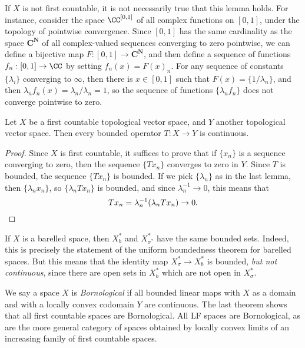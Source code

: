 \begin{example}
    If $X$ is not first countable, it is not necessarily true that this lemma holds. For instance, consider the space $\CC^{[0,1]}$ of all complex functions on $[0,1]$, under the topology of pointwise convergence. Since $[0,1]$ has the same cardinality as the space $\mathbf{C}^{\mathbf{N}}$ of all complex-valued sequences converging to zero pointwise, we can define a bijective map $F: [0,1] \to \mathbf{C}^{\mathbf{N}}$, and then define a sequence of functions $f_n: [0,1] \to \CC$ by setting $f_n(x) = F(x)_n$. For any sequence of constants $\{ \lambda_i \}$ converging to $\infty$, then there is $x \in [0,1]$ such that $F(x) = \{ 1/\lambda_n \}$, and then $\lambda_n f_n(x) = \lambda_n/\lambda_n = 1$, so the sequence of functions $\{ \lambda_n f_n \}$ does not converge pointwise to zero.
\end{example}

\begin{theorem}
    Let $X$ be a first countable topological vector space, and $Y$ another topological vector space. Then every bounded operator $T: X \to Y$ is continuous.
\end{theorem}
\begin{proof}
    Since $X$ is first countable, it suffices to prove that if $\{ x_n \}$ is a sequence converging to zero, then the sequence $\{ Tx_n \}$ converges to zero in $Y$. Since $T$ is bounded, the sequence $\{ Tx_n \}$ is bounded. If we pick $\{ \lambda_n \}$ as in the last lemma, then $\{ \lambda_n x_n \}$, so $\{ \lambda_n Tx_n \}$ is bounded, and since $\lambda_n^{-1} \to 0$, this means that
    \[ Tx_n = \lambda_n^{-1} (\lambda_n Tx_n) \to 0. \qedhere \]
\end{proof}

\begin{example}
    If $X$ is a barelled space, then $X^*_b$ and $X^*_{\sigma^*}$ have the same bounded sets. Indeed, this is precisely the statement of the uniform boundedness theorem for barelled spaces. But this means that the identity map $X^*_\sigma \to X^*_b$ is bounded, \emph{but not continuous}, since there are open sets in $X^*_b$ which are not open in $X^*_\sigma$.
\end{example}

We say a space $X$ is \emph{Bornological} if all bounded linear maps with $X$ as a domain and with a locally convex codomain $Y$ are continuous. The last theorem shows that all first countable spaces are Bornological. All LF spaces are Bornological, as are the more general category of spaces obtained by locally convex limits of an increasing family of first countable spaces.

